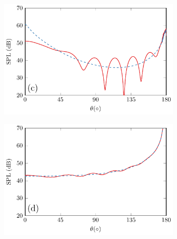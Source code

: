 \begin{figure}[!htb]
\begin{subfigure}{0.49\textwidth}
    \end{subfigure}
    \\
    \begin{subfigure}{0.49\textwidth}
        \centering
        \includegraphics[width = \textwidth]{fig/PalSphereNoSphere_VaryAngle_211211A_Compare_r100cm_1000Hz_211211C.pdf}
    \end{subfigure}
    \begin{subfigure}{0.49\textwidth}
        \centering
        \includegraphics[width = \textwidth]{fig/CircPistonSphereNoSphere_210718D_1000Hz_Compare_211013Aq_v2.pdf}
    \end{subfigure}
    \\
    \begin{subfigure}{0.49\textwidth}
        \centering

\end{subfigure}
\end{figure}
